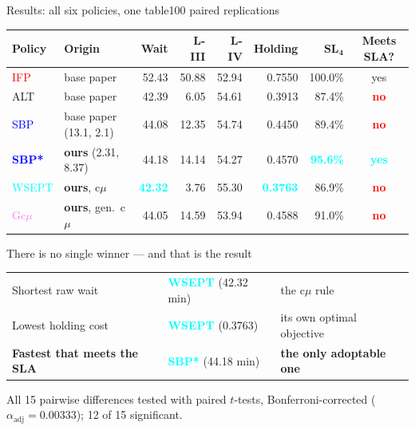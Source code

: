 \documentclass[aspectratio=169,11pt]{beamer}
\newcommand{\good}[1]{\textcolor{aqua}{\textbf{#1}}}
\newcommand{\bad}[1]{\textcolor{red}{\textbf{#1}}}
\begin{document}
\begin{frame}{Results: all six policies, one table}{100 paired replications}
\vspace{-0.2em}
\begin{center}\footnotesize
\begin{tabular}{@{}llrrrrrc@{}}
\toprule
\textbf{Policy} & \textbf{Origin} & \textbf{Wait} & \textbf{L-III} &
\textbf{L-IV} & \textbf{Holding} & $\mathbf{SL_4}$ & \textbf{Meets SLA?} \\
\midrule
\textcolor{red}{IFP}    & base paper        & 52.43 & 50.88 & 52.94 & 0.7550 & 100.0\% & yes \\
\textcolor{amber}{ALT}  & base paper        & 42.39 &  6.05 & 54.61 & 0.3913 &  87.4\% & \bad{no} \\
\textcolor{blue}{SBP}   & base paper (13.1, 2.1) & 44.08 & 12.35 & 54.74 & 0.4450 & 89.4\% & \bad{no} \\
\textcolor{blue}{\textbf{SBP*}} & \textbf{ours} (2.31, 8.37) & 44.18 & 14.14 & 54.27 & 0.4570 & \good{95.6\%} & \good{yes} \\
\textcolor{aqua}{WSEPT} & \textbf{ours}, c$\mu$ & \good{42.32} & 3.76 & 55.30 & \good{0.3763} & 86.9\% & \bad{no} \\
\textcolor{violet}{Gc$\mu$} & \textbf{ours}, gen.\ c$\mu$ & 44.05 & 14.59 & 53.94 & 0.4588 & 91.0\% & \bad{no} \\
\bottomrule
\end{tabular}
\end{center}
\vspace{0.5em}

\begin{block}{There is no single winner --- and that is the result}
\small
\begin{tabular}{@{}p{4.1cm}p{3.7cm}p{4.9cm}@{}}
Shortest raw wait & \good{WSEPT} (42.32 min) & the c$\mu$ rule \\
Lowest holding cost & \good{WSEPT} (0.3763) & its own optimal objective \\
\textbf{Fastest that meets the SLA} & \good{SBP*} (44.18 min)
  & \textbf{the only adoptable one} \\
\end{tabular}
\end{block}
\vspace{0.2em}
{\scriptsize\color{soft} All 15 pairwise differences tested with paired
$t$-tests, Bonferroni-corrected ($\alpha_{\text{adj}}=0.00333$); 12 of 15
significant.}
\end{frame}
\end{document}
